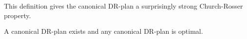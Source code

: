 This definition gives the canonical DR-plan a surprisingly strong Church-Rosser property.

\begin{theorem}
\label{theorem:canonical_exists_and_is_optimal}
\label{theorem:canonical_is_optimal}
\label{theorem:main}
    A canonical DR-plan exists and any canonical DR-plan is optimal.
\end{theorem}







